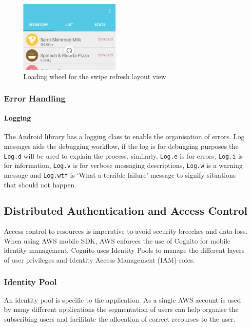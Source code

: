 \documentclass[a4paper, 11pt]{article}
\begin{document}
\begin{figure}[!htbp]
\centering
\includegraphics[width=5cm]{swiperefreshlayout}
\caption{Loading wheel for the swipe refresh layout view} \label{fig:swiperefreshlayout}
\end{figure}


\subsubsection{Error Handling}
\paragraph{Logging} The Android library has a logging class to enable the organisation of errors. Log messages aids the debugging workflow, if the log is for debugging purposes the \texttt{Log.d} will be used to explain the process, similarly, \texttt{Log.e} is for errors, \texttt{Log.i} is for information, \texttt{Log.v} is for verbose messaging descriptions, \texttt{Log.w} is a warning message and \texttt{Log.wtf} is `What a terrible failure' message to signify situations that should not happen. \cite{android}

\subsection{Distributed Authentication and Access Control}
Access control to resources is imperative to avoid security breeches and data loss. When using AWS mobile SDK, AWS enforces the use of Cognito for mobile identity management. Cognito uses Identity Pools to manage the different layers of user privileges and Identity Access Management (IAM) roles.

\subsubsection{Identity Pool}
An identity pool is specific to the application. As a single AWS account is used by many different applications the segmentation of users can help organise the subscribing users and facilitate the allocation of correct recourses to the user. 
\end{document}
